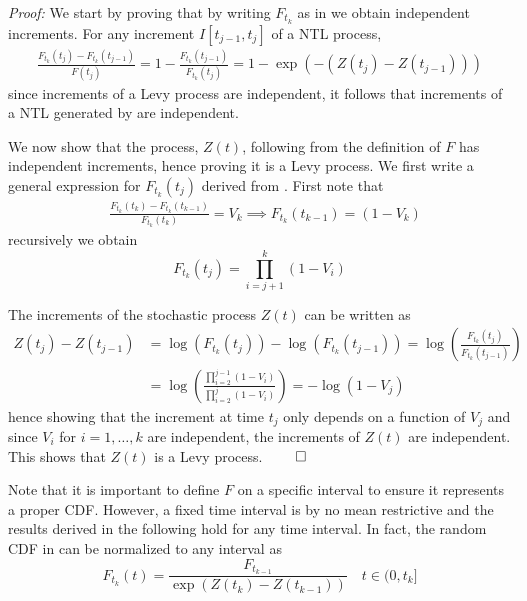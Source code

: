 \textit{Proof:} We start by proving that by writing $F_{t_k}$ as in  we obtain independent increments. For any increment $I[t_{j-1}, t_j]$ of a NTL process,
\begin{equation}\label{jump_equation}
\begin{split}
\frac{F_{t_k}(t_j) - F_{t_k}(t_{j-1})}{F(t_j)} = 1 - \frac{F_{t_k}(t_{j-1})}{F_{t_k}(t_j)} = 1 - \exp\left(-(Z(t_j) - Z(t_{j-1}))\right)
\end{split}
\end{equation}
since increments of a Levy process are independent, it follows that increments of a NTL generated by  are independent. 

We now show that the process, $Z(t)$, following from the definition of $F$ has independent increments, hence proving it is a Levy process. We first write a general expression for $F_{t_k}(t_j)$ derived from . First note that
\begin{equation*}
\begin{split}
&\frac{F_{t_k}(t_k) - F_{t_k}(t_{k-1})}{F_{t_k}(t_{k})} = V_k \implies F_{t_k}(t_{k-1}) = (1-V_k)
\end{split}
\end{equation*} 
recursively we obtain
\begin{equation}\label{NTL_F}
F_{t_k}(t_j) = \prod_{i=j+1}^k (1 - V_i)
\end{equation}

The increments of the stochastic process $Z(t)$ can be written as 
\begin{equation*}
\begin{split}
Z(t_j) - Z(t_{j-1}) &= \log(F_{t_k}(t_j)) - \log(F_{t_k}(t_{j-1}))  = \log\left(\frac{F_{t_k}(t_{j})}{F_{t_k}(t_{j-1})}\right) \\ &= \log\left(\frac{\prod_{i=2}^{j-1} (1 - V_i)}{\prod_{i=2}^{j} (1 - V_i)}\right) = -\log(1 - V_j)
\end{split}
\end{equation*}
hence showing that the increment at time $t_j$ only depends on a function of $V_j$ and since $V_i$ for $i=1, \ldots, k$ are independent, the increments of $Z(t)$ are independent. This shows that $Z(t)$ is a Levy process. $\qed$

Note that it is important to define $F$ on a specific interval to ensure it represents a proper CDF. However, a fixed time interval is by no mean restrictive and the results derived in the following hold for any time interval. In fact, the random CDF in  can be normalized to any interval as
\begin{equation*}
F_{t_k}(t) = \frac{F_{t_{k-1}}}{\exp(Z(t_k) - Z(t_{k-1}))} \quad t \in (0, t_k]
\end{equation*}

